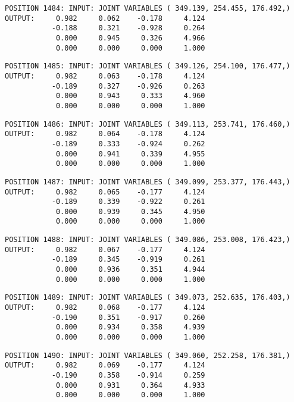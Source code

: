 \begin{verbatim}
POSITION 1484: INPUT: JOINT VARIABLES ( 349.139, 254.455, 176.492,)
OUTPUT:     0.982     0.062    -0.178     4.124
           -0.188     0.321    -0.928     0.264
            0.000     0.945     0.326     4.966
            0.000     0.000     0.000     1.000
\end{verbatim} \pagebreak[1]\begin{verbatim}
POSITION 1485: INPUT: JOINT VARIABLES ( 349.126, 254.100, 176.477,)
OUTPUT:     0.982     0.063    -0.178     4.124
           -0.189     0.327    -0.926     0.263
            0.000     0.943     0.333     4.960
            0.000     0.000     0.000     1.000
\end{verbatim} \pagebreak[1]\begin{verbatim}
POSITION 1486: INPUT: JOINT VARIABLES ( 349.113, 253.741, 176.460,)
OUTPUT:     0.982     0.064    -0.178     4.124
           -0.189     0.333    -0.924     0.262
            0.000     0.941     0.339     4.955
            0.000     0.000     0.000     1.000
\end{verbatim} \pagebreak[1]\begin{verbatim}
POSITION 1487: INPUT: JOINT VARIABLES ( 349.099, 253.377, 176.443,)
OUTPUT:     0.982     0.065    -0.177     4.124
           -0.189     0.339    -0.922     0.261
            0.000     0.939     0.345     4.950
            0.000     0.000     0.000     1.000
\end{verbatim} \pagebreak[1]\begin{verbatim}
POSITION 1488: INPUT: JOINT VARIABLES ( 349.086, 253.008, 176.423,)
OUTPUT:     0.982     0.067    -0.177     4.124
           -0.189     0.345    -0.919     0.261
            0.000     0.936     0.351     4.944
            0.000     0.000     0.000     1.000
\end{verbatim} \pagebreak[1]\begin{verbatim}
POSITION 1489: INPUT: JOINT VARIABLES ( 349.073, 252.635, 176.403,)
OUTPUT:     0.982     0.068    -0.177     4.124
           -0.190     0.351    -0.917     0.260
            0.000     0.934     0.358     4.939
            0.000     0.000     0.000     1.000
\end{verbatim} \pagebreak[1]\begin{verbatim}
POSITION 1490: INPUT: JOINT VARIABLES ( 349.060, 252.258, 176.381,)
OUTPUT:     0.982     0.069    -0.177     4.124
           -0.190     0.358    -0.914     0.259
            0.000     0.931     0.364     4.933
            0.000     0.000     0.000     1.000
\end{verbatim} \pagebreak[1]\begin{verbatim}

\end{verbatim}
